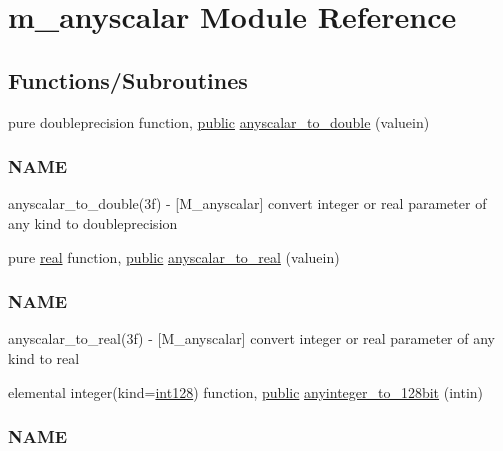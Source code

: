 \hypertarget{namespacem__anyscalar}{}\section{m\+\_\+anyscalar Module Reference}
\label{namespacem__anyscalar}
\subsection*{Functions/\+Subroutines}
\begin{DoxyCompactItemize}
\item 
pure doubleprecision function, \hyperlink{M__stopwatch_83_8txt_a2f74811300c361e53b430611a7d1769f}{public} \hyperlink{namespacem__anyscalar_a6173dbc57e7c5a96f5961d9e83e6e15e}{anyscalar\+\_\+to\+\_\+double} (valuein)
\begin{DoxyCompactList}\small\item\em \subsubsection*{N\+A\+ME}

anyscalar\+\_\+to\+\_\+double(3f) -\/ \mbox{[}M\+\_\+anyscalar\mbox{]} convert integer or real parameter of any kind to doubleprecision \end{DoxyCompactList}\item 
pure \hyperlink{read__watch_83_8txt_abdb62bde002f38ef75f810d3a905a823}{real} function, \hyperlink{M__stopwatch_83_8txt_a2f74811300c361e53b430611a7d1769f}{public} \hyperlink{namespacem__anyscalar_a39cd9a778fff85974fa1a822b92555fd}{anyscalar\+\_\+to\+\_\+real} (valuein)
\begin{DoxyCompactList}\small\item\em \subsubsection*{N\+A\+ME}

anyscalar\+\_\+to\+\_\+real(3f) -\/ \mbox{[}M\+\_\+anyscalar\mbox{]} convert integer or real parameter of any kind to real \end{DoxyCompactList}\item 
elemental integer(kind=\hyperlink{namespacem__anyscalar_a53057899b7d17505b79d9b8f5e6092a2}{int128}) function, \hyperlink{M__stopwatch_83_8txt_a2f74811300c361e53b430611a7d1769f}{public} \hyperlink{namespacem__anyscalar_a513beeccb5c821157cbd2eea8a1d9842}{anyinteger\+\_\+to\+\_\+128bit} (intin)
\begin{DoxyCompactList}\small\item\em \subsubsection*{N\+A\+ME}\end{DoxyCompactList}\end{DoxyCompactItemize}
